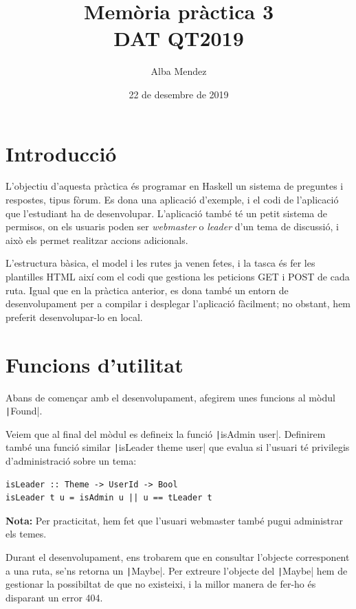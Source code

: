 \documentclass[catalan, a4paper]{scrartcl}
\author{Alba Mendez}
\title{Memòria pràctica 3\\
{\small DAT QT2019}}
\date{22 de desembre de 2019}
\begin{document}
\maketitle


\section{Introducció}

L'objectiu d'aquesta pràctica és programar en Haskell un sistema de preguntes
i respostes, tipus fòrum. Es dona una aplicació d'exemple, i el codi de l'aplicació
que l'estudiant ha de desenvolupar. L'aplicació també té un petit sistema de permisos,
on els usuaris poden ser \emph{webmaster} o \emph{leader} d'un tema de discussió,
i això els permet realitzar accions adicionals.

L'estructura bàsica, el model i les rutes ja venen fetes,
i la tasca és fer les plantilles HTML així com el codi que gestiona les peticions
\textsf{GET} i \textsf{POST} de cada ruta. Igual que en la pràctica anterior,
es dona també un entorn de desenvolupament per a compilar i desplegar l'aplicació
fàcilment; no obstant, hem preferit desenvolupar-lo en local.


\section{Funcions d'utilitat}

Abans de començar amb el desenvolupament, afegirem unes funcions al mòdul \texttt|Found|.

Veiem que al final del mòdul es defineix la funció \texttt|isAdmin user|.
Definirem també una funció similar \texttt|isLeader theme user| que evalua si
l'usuari té privilegis
d'administració sobre un tema:

\begin{verbatim}
isLeader :: Theme -> UserId -> Bool
isLeader t u = isAdmin u || u == tLeader t
\end{verbatim}

\textbf{Nota:} Per practicitat, hem fet que l'usuari webmaster també pugui administrar els temes.

Durant el desenvolupament, ens trobarem que en consultar l'objecte corresponent
a una ruta, se'ns retorna un \texttt|Maybe|. Per extreure l'objecte
del \texttt|Maybe| hem de gestionar la possibiltat de que no existeixi,
i la millor manera de fer-ho és disparant un error 404.
\end{document}
